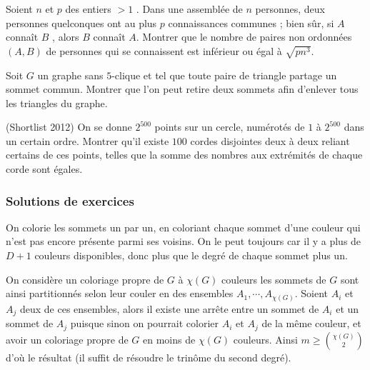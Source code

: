 \begin{exo}
Soient $n$ et $p$ des entiers $> 1$ . Dans une assemblée de $n$ personnes, deux personnes quelconques ont au plus $p$ connaissances communes ; bien sûr, si $A$ connaît $B$ , alors $B$ connaît $A$. Montrer que le nombre de paires non ordonnées $(A , B)$ de personnes qui se connaissent est inférieur ou égal à $\sqrt{pn^3}$.
\end{exo}

\begin{exo}
Soit $G$ un graphe sans $5$-clique et tel que toute paire de triangle partage un sommet commun. Montrer que l'on peut retire deux sommets afin d'enlever tous les triangles du graphe.
\end{exo}

\begin{exo}
(Shortlist 2012) On se donne $2^{500}$ points sur un cercle, numérotés de $1$ à $2^{500}$ dans un certain ordre. Montrer qu'il existe $100$ cordes disjointes deux à deux reliant certains de ces points, telles que la somme des nombres aux extrémités de chaque corde sont égales.
\end{exo}

\subsubsection{Solutions de exercices}

\begin{sol}
On colorie les sommets un par un, en coloriant chaque sommet d'une couleur qui n'est pas encore présente parmi ses voisins. On le peut toujours car il y a plus de $D+1$ couleurs disponibles, donc plus que le degré de chaque sommet plus un.
\end{sol}

\begin{sol}
On considère un coloriage propre de $G$ à $\chi(G)$ couleurs les sommets de $G$ sont ainsi partitionnés selon leur couler en des ensembles $A_1,\cdots,A_{\chi(G)}$. Soient $A_i$ et $A_j$ deux de ces ensembles, alors il existe une arrête entre  un sommet de $A_i$ et un sommet de $A_j$ puisque sinon on pourrait colorier $A_i$ et $A_j$ de la même couleur, et avoir un coloriage propre de $G$ en moins de $\chi(G)$ couleurs. Ainsi $m\geq {\chi(G) \choose 2}$ d'où le résultat (il suffit de résoudre le trinôme du second degré).
\end{sol}

